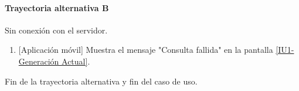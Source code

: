 \paragraph{Trayectoria alternativa B} \label{SUB-U-CU1.1:TB}
	Sin conexión con el servidor.
	\begin{enumerate}[label=B\arabic*.]
		\item {[Aplicación móvil]} Muestra el mensaje "Consulta fallida" en la pantalla \hyperref[fig:monitoreoReal]{[IU1-Generación Actual]}.
	\end{enumerate}
	Fin de la trayectoria alternativa y fin del caso de uso.


